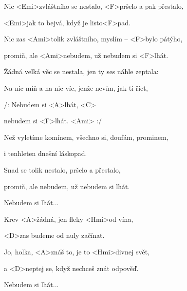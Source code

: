 

\zs
Nic <Emi>zvláštního se nestalo, <F>pršelo a pak přestalo,

<Emi>jak to bejvá, když je listo<F>pad.

Nic zas <Ami>tolik zvláštního, myslím – <F>bylo pátýho,

promiň, ale <Ami>nebudem, už nebudem si <F>lhát.
\ks

\zs
Žádná velká věc se nestala, jen ty ses náhle zeptala:


Na nic míň a na nic víc, jenže nevím, jak ti říct,

\ks

\zr
/: Nebudem si <A>lhát, <C>

nebudem si <F>lhát. <Ami> :/
\kr

\zs
Než vyletíme komínem, všechno si, doufám, prominem,

i tenhleten dnešní láskopad.

Snad se tolik nestalo, pršelo a přestalo,

promiň, ale nebudem, už nebudem si lhát.
\ks

\zr
Nebudem si lhát...
\kr

\zs
Krev <A>žádná, jen fleky <Hmi>od vína,

<D>zas budeme od nuly začínat.

Jo, holka, <A>znáš to, je to <Hmi>divnej svět,

a <D>neptej se, když nechceš znát odpověď.
\ks

\zr
Nebudem si lhát...
\kr

\kp
